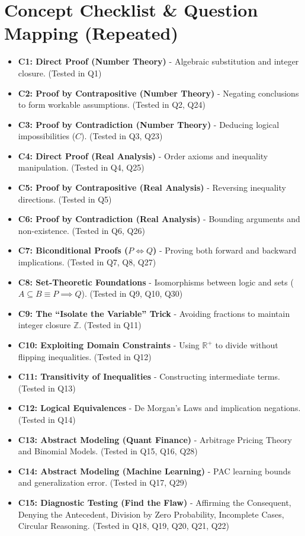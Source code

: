\documentclass[11pt]{article}
\begin{document}
\section{Concept Checklist \& Question Mapping (Repeated)}
\label{sec:checklist_end}
\begin{itemize}
    \item \textbf{C1: Direct Proof (Number Theory)} - Algebraic substitution and integer closure. (Tested in Q1)
    \item \textbf{C2: Proof by Contrapositive (Number Theory)} - Negating conclusions to form workable assumptions. (Tested in Q2, Q24)
    \item \textbf{C3: Proof by Contradiction (Number Theory)} - Deducing logical impossibilities ($C$). (Tested in Q3, Q23)
    \item \textbf{C4: Direct Proof (Real Analysis)} - Order axioms and inequality manipulation. (Tested in Q4, Q25)
    \item \textbf{C5: Proof by Contrapositive (Real Analysis)} - Reversing inequality directions. (Tested in Q5)
    \item \textbf{C6: Proof by Contradiction (Real Analysis)} - Bounding arguments and non-existence. (Tested in Q6, Q26)
    \item \textbf{C7: Biconditional Proofs ($P \iff Q$)} - Proving both forward and backward implications. (Tested in Q7, Q8, Q27)
    \item \textbf{C8: Set-Theoretic Foundations} - Isomorphisms between logic and sets ($A \subseteq B \equiv P \implies Q$). (Tested in Q9, Q10, Q30)
    \item \textbf{C9: The ``Isolate the Variable'' Trick} - Avoiding fractions to maintain integer closure $\mathbb{Z}$. (Tested in Q11)
    \item \textbf{C10: Exploiting Domain Constraints} - Using $\mathbb{R}^+$ to divide without flipping inequalities. (Tested in Q12)
    \item \textbf{C11: Transitivity of Inequalities} - Constructing intermediate terms. (Tested in Q13)
    \item \textbf{C12: Logical Equivalences} - De Morgan's Laws and implication negations. (Tested in Q14)
    \item \textbf{C13: Abstract Modeling (Quant Finance)} - Arbitrage Pricing Theory and Binomial Models. (Tested in Q15, Q16, Q28)
    \item \textbf{C14: Abstract Modeling (Machine Learning)} - PAC learning bounds and generalization error. (Tested in Q17, Q29)
    \item \textbf{C15: Diagnostic Testing (Find the Flaw)} - Affirming the Consequent, Denying the Antecedent, Division by Zero Probability, Incomplete Cases, Circular Reasoning. (Tested in Q18, Q19, Q20, Q21, Q22)
\end{itemize}
\end{document}
